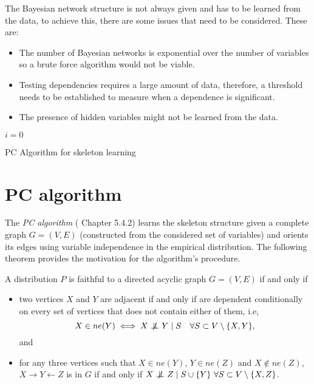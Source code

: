 
The Bayesian network structure is not always given and has to be learned from the data, to achieve this, there are some issues that need to be considered. These are:
\begin{itemize}\setlength{\itemsep}{0.15cm}
  \item The number of Bayesian networks is exponential over the number of variables so a brute force algorithm would not be viable.
  \item Testing dependencies requires a large amount of data, therefore, a threshold needs to be established to measure when a dependence is significant.
  \item The presence of hidden variables might not be learned from the data.
\end{itemize}


\begin{algorithm}[t]
  \SetAlgoLined{}
  \(i = 0\)\;
  \caption{PC Algorithm for skeleton learning}\label{alg:pc}
\end{algorithm}

\section{PC algorithm}

The \emph{PC algorithm} (\cite{spirtes2000causation} Chapter 5.4.2) learns the skeleton structure given a complete graph \(G=(V,E)\) (constructed from the considered set of variables) and orients its edges using variable independence in the empirical distribution. The following theorem provides the motivation for the algorithm's procedure.

\begin{theorem}
  A distribution \(P\) is faithful to a directed acyclic graph \(G = (V,E)\)  if and only if
  \begin{itemize}
    \item two vertices \(X\) and \(Y\) are adjacent if and only if are dependent conditionally on every set of vertices that does not contain either of them, i.e,
      \[
      X \in ne(Y) \iff X \bigCD Y \mid S \quad \forall S \subset V \setminus \{X,Y\},
      \]
      and
    \item for any three vertices such that \(X \in ne(Y)\), \(Y \in ne(Z)\) and \(X \notin ne(Z)\),  \(X \to Y \leftarrow Z\) is in \(G\) if and only if \(X \bigCD Z \mid S\cup \{Y\} \ \forall S \subset V \setminus \{X,Z\}\).
  \end{itemize}

\end{theorem}

